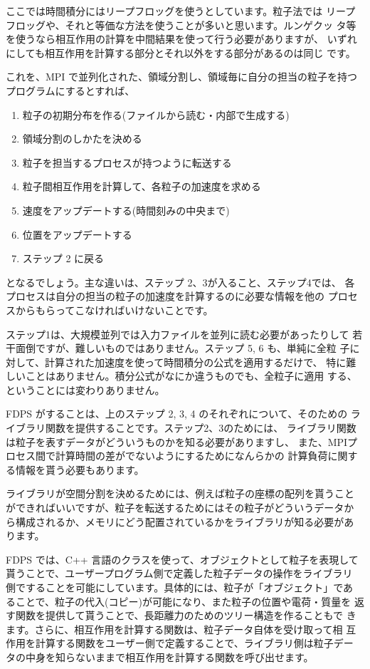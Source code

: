 ここでは時間積分にはリープフロッグを使うとしています。粒子法では
リープフロッグや、それと等価な方法を使うことが多いと思います。ルンゲクッ
タ等を使うなら相互作用の計算を中間結果を使って行う必要がありますが、
いずれにしても相互作用を計算する部分とそれ以外をする部分があるのは同じ
です。


これを、MPI で並列化された、領域分割し、領域毎に自分の担当の粒子を持つ
プログラムにするとすれば、

\begin{enumerate}

\item 粒子の初期分布を作る(ファイルから読む・内部で生成する)
\item 領域分割のしかたを決める
\item 粒子を担当するプロセスが持つように転送する
\item 粒子間相互作用を計算して、各粒子の加速度を求める
\item 速度をアップデートする(時間刻みの中央まで)
\item 位置をアップデートする  
\item ステップ 2 に戻る
\end{enumerate}

となるでしょう。主な違いは、ステップ 2、3が入ること、ステップ4では、
各プロセスは自分の担当の粒子の加速度を計算するのに必要な情報を他の
プロセスからもらってこなければいけないことです。


ステップ1は、大規模並列では入力ファイルを並列に読む必要があったりして
若干面倒ですが、難しいものではありません。ステップ 5, 6 も、単純に全粒
子に対して、計算された加速度を使って時間積分の公式を適用するだけで、
特に難しいことはありません。積分公式がなにか違うものでも、全粒子に適用
する、ということには変わりありません。

FDPS がすることは、上のステップ 2, 3, 4 のそれぞれについて、そのための
ライブラリ関数を提供することです。ステップ2、3のためには、
ライブラリ関数は粒子を表すデータがどういうものかを知る必要がありますし、
また、MPIプロセス間で計算時間の差がでないようにするためになんらかの
計算負荷に関する情報を貰う必要もあります。

ライブラリが空間分割を決めるためには、例えば粒子の座標の配列を貰うこと
ができればいいですが、粒子を転送するためにはその粒子がどういうデータか
ら構成されるか、メモリにどう配置されているかをライブラリが知る必要があ
ります。

FDPS では、C++ 言語のクラスを使って、オブジェクトとして粒子を表現して
貰うことで、ユーザープログラム側で定義した粒子データの操作をライブラリ
側ですることを可能にしています。具体的には、粒子が「オブジェクト」であ
ることで、粒子の代入(コピー)が可能になり、また粒子の位置や電荷・質量を
返す関数を提供して貰うことで、長距離力のためのツリー構造を作ることもで
きます。さらに、相互作用を計算する関数は、粒子データ自体を受け取って相
互作用を計算する関数をユーザー側で定義することで、ライブラリ側は粒子デー
タの中身を知らないままで相互作用を計算する関数を呼び出せます。

